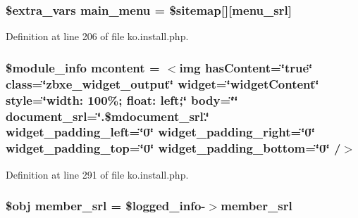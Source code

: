 \hypertarget{ko_8install_8php_ac71104c770b8ced3891f35849d3f2906}{}
\subsubsection[{main\+\_\+menu}]{\setlength{\rightskip}{0pt plus 5cm}\${\bf extra\+\_\+vars} main\+\_\+menu = \$sitemap\mbox{[}\textquotesingle{}\mbox{]}\mbox{[}\textquotesingle{}menu\+\_\+srl\textquotesingle{}\mbox{]}}\label{ko_8install_8php_ac71104c770b8ced3891f35849d3f2906}


Definition at line 206 of file ko.\+install.\+php.

\hypertarget{ko_8install_8php_a9da4bb6e77356bb68ae0e05dbd9f5e2f}{}
\subsubsection[{mcontent}]{\setlength{\rightskip}{0pt plus 5cm}\$module\+\_\+info {\bf mcontent} = \textquotesingle{}$<$img has\+Content=\char`\"{}true\char`\"{} class=\char`\"{}zbxe\+\_\+widget\+\_\+output\char`\"{} widget=\char`\"{}widget\+Content\char`\"{} style=\char`\"{}width\+: 100\%; float\+: left;\char`\"{} body=\char`\"{}\char`\"{} document\+\_\+srl=\char`\"{}\textquotesingle{}.\$mdocument\+\_\+srl.\textquotesingle{}\char`\"{} widget\+\_\+padding\+\_\+left=\char`\"{}0\char`\"{} widget\+\_\+padding\+\_\+right=\char`\"{}0\char`\"{} widget\+\_\+padding\+\_\+top=\char`\"{}0\char`\"{} widget\+\_\+padding\+\_\+bottom=\char`\"{}0\char`\"{} /$>$\textquotesingle{}}\label{ko_8install_8php_a9da4bb6e77356bb68ae0e05dbd9f5e2f}


Definition at line 291 of file ko.\+install.\+php.

\hypertarget{ko_8install_8php_aa61f9e08f0fe505094d26f8143f30bbd}{}
\subsubsection[{member\+\_\+srl}]{\setlength{\rightskip}{0pt plus 5cm}\$obj member\+\_\+srl = \$logged\+\_\+info-\/$>$member\+\_\+srl}\label{ko_8install_8php_aa61f9e08f0fe505094d26f8143f30bbd}


